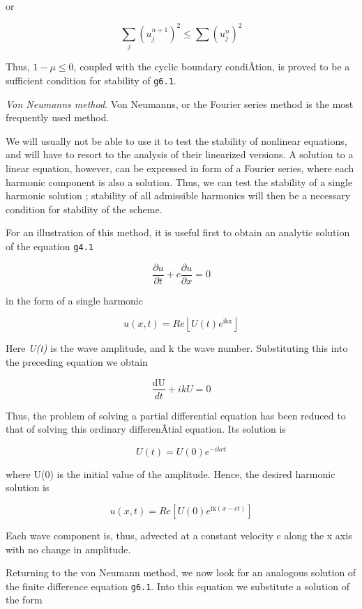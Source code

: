 or

\[{\sum_{j}^{}\left( u_{j}^{n + 1} \right)}^{2} \leq \sum_{}^{}\left( u_{j}^{n} \right)^{2}\]

Thus, \( 1 - \mu \leq 0\), coupled with the cyclic boundary condiÂ­tion,
is proved to be a sufficient condition for stability of \texttt{g6.1}.

\emph{Von Neumann\textquotesingle s method}. Von
Neumann\textquotesingle s, or the Fourier series method is the most
frequently used method.

We will usually not be able to use it to test the stability of nonlinear
equations, and will have to resort to the analysis of their linearized
versions. A solution to a linear equation, however, can be expressed in
form of a Fourier series, where each harmonic component is also a
solution. Thus, we can test the stability of a single harmonic solution
; stability of all admissible harmonics will then be a necessary
condition for stability of the scheme.

For an illustration of this method, it is useful first to obtain an
analytic solution of the equation \texttt{g4.1}

\[\frac{\partial u}{\partial t}+c \frac{\partial u}{\partial x}=0\]

in the form of a single harmonic

{\[u\left( x,t \right) = Re\left\lfloor U\left( t \right)e^{\text{ikx}} \right\rfloor\]}

Here \emph{U(t)} is the wave amplitude, and k the wave number.
Substituting this into the preceding equation we obtain

\[\frac{\text{dU}}{d t} +ikU = 0\]

Thus, the problem of solving a partial differential equation has been
reduced to that of solving this ordinary differenÂ­tial equation. Its
solution is

\[U(t) =U(0)e^{- ikct}\]

where U(0) is the initial value of the amplitude. Hence, the desired
harmonic solution is

{\[u\left( x,t \right) =Re \left\lbrack U\left( 0 \right)e^{\text{ik}\left( x - ct \right)} \right\rbrack\]}

Each wave component is, thus, advected at a constant velocity c along
the x axis with no change in amplitude.

Returning to the von Neumann method, we now look for an analogous
solution of the finite difference equation \texttt{g6.1}. Into this
equation we substitute a solution of the form

